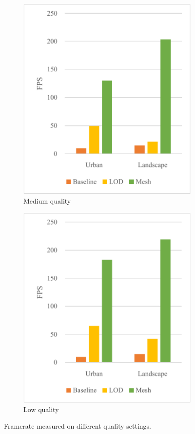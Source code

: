 \begin{figure}[h]
\begin{subfigure}{0.3\textwidth}
        \includegraphics[width=\textwidth]{graph-fps-med.pdf}
        \caption{Medium quality}
    \end{subfigure}
    \begin{subfigure}{0.3\textwidth}
        \centering
        \includegraphics[width=\textwidth]{graph-fps-low.pdf}
        \caption{Low quality}
    \end{subfigure}
    
    \caption{Framerate measured on different quality settings.}
    \label{fig:results:graph-fps}
\end{figure}